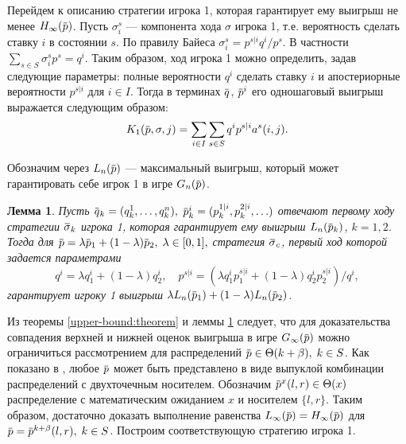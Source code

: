 \documentclass[12pt, draft]{extarticle}
\newtheorem{lemma}{Лемма}
\newcommand{\overbar}[1]%
{\mkern 1.5mu\overline{\mkern-1.3mu#1\mkern-1.3mu}\mkern 1.3mu}
\newcommand{\p}{\ensuremath{\overbar{p}}}
\newcommand{\q}{\ensuremath{\overbar{q}}}
\newcommand{\G}[1][n]{\ensuremath{G_{#1}}}
\newcommand{\K}[1][n]{\ensuremath{K_{#1}}}
\newcommand{\High}[1][\ensuremath{\infty}]{\ensuremath{H_{#1}}}
\newcommand{\sigmav}{\ensuremath{\overbar{\sigma}}}
\newcommand{\Low}[1][\ensuremath{\infty}]{\ensuremath{L_{#1}}}
\begin{document}
Перейдем к описанию стратегии игрока 1, которая гарантирует ему выигрыш не менее
$\High(\p)$. Пусть $\sigma^s_i$ --- компонента хода $\sigma$ игрока 1, т.е.
вероятность сделать ставку $i$ в состоянии $s$. По правилу Байеса $\sigma^s_i =
p^{s|i} q^i / p^s$. В частности $\sum_{s \in S} \sigma^s_i p^s = q^i$. Таким
образом, ход игрока 1 можно определить, задав следующие параметры: полные
вероятности $q^i$ сделать ставку $i$ и апостериорные вероятности $p^{s|i}$ для
$i \in I$. Тогда в терминах $\q$, $\p^i$ его одношаговый выигрыш выражается
следующим образом:
\begin{equation}
  \label{lower-bound:eq:K1(q,pi)}
  \K[1](\p, \sigma, j) = \sum_{i \in I} \sum_{s \in S} q^i p^{s|i} a^s(i, j).
\end{equation}

Обозначим через $\Low[n](\p)$ --- максимальный выигрыш, который может
гарантировать себе игрок 1 в игре $\G(\p)$.
\begin{lemma}
  \label{lower-bound:lemma:convex-combination}
  Пусть %
  $\q_k = (q^1_k, \ldots, q^n_k),$ %
  $\p^i_k = ( p^{1|i}_k, p^{2|i}_k, \ldots)$ %
  отвечают первому ходу стратегии $\sigmav_k$ игрока 1, которая гарантирует ему
  выигрыш $\Low[n](\p_k)$, $k = 1,2$. Тогда для $\p = \lambda \p_1 + (1-\lambda)
  \p_2, \; \lambda \in [0, 1],$ стратегия $\sigmav_c$, первый ход которой
  задается параметрами
  \begin{equation}
    \label{lower-bound:eq:q-pi}
    q^i = \lambda q^i_1 + (1-\lambda) q^i_2, \quad
    p^{s|i} = \left(\lambda q^i_1 p^{s|i}_1 + (1-\lambda) q^i_2 p^{s|i}_2\right)/q^i,
  \end{equation}
  гарантирует игроку 1 выигрыш $\lambda \Low[n](\p_1) + (1-\lambda)
  \Low[n](\p_2)$.
\end{lemma}

Из теоремы \ref{upper-bound:theorem} и леммы
\ref{lower-bound:lemma:convex-combination} следует, что для доказательства
совпадения верхней и нижней оценок выигрыша в игре $\G[\infty](\p)$ можно
ограничиться рассмотрением для распределений $\p \in \Theta(k + \beta), \; k \in
S$. Как показано в \cite{bib:domansky11}, любое $\p$ может быть представлено в
виде выпуклой комбинации распределений с двухточечным носителем. Обозначим
$\p^x(l, r) \in \Theta(x)$ распределение с математическим ожиданием $x$ и
носителем $\{l, r\}$. Таким образом, достаточно доказать выполнение равенства
$\Low(\p) = \High(\p)$ для $\p = \p^{k+\beta}(l,r), \; k \in S$. Построим
соответствующую стратегию игрока 1.
\end{document}
